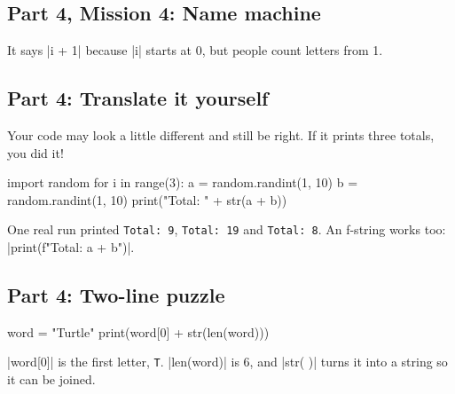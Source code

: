 \subsection*{Part 4, Mission 4: Name machine}
It says \py|i + 1| because \py|i| starts at 0, but people count letters from 1.

\subsection*{Part 4: Translate it yourself}
Your code may look a little different and still be right. If it prints three totals, you did it!
\begin{codenonum}
import random
for i in range(3):
    a = random.randint(1, 10)
    b = random.randint(1, 10)
    print("Total: " + str(a + b))
\end{codenonum}
One real run printed \texttt{Total: 9}, \texttt{Total: 19} and \texttt{Total: 8}. An f-string works too: \py|print(f"Total: {a + b}")|.

\subsection*{Part 4: Two-line puzzle}
\begin{codenonum}
word = "Turtle"
print(word[0] + str(len(word)))
\end{codenonum}
\py|word[0]| is the first letter, \texttt{T}. \py|len(word)| is 6, and \py|str( )| turns it into a string so it can be joined.
